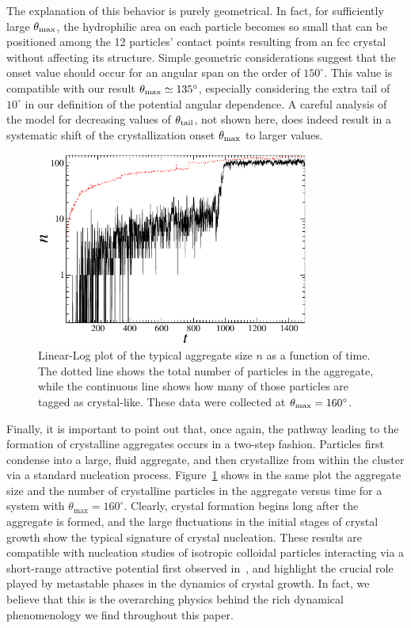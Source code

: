 The explanation of this behavior is purely geometrical.
In fact, for sufficiently large $\theta_{\rm max}$, the hydrophilic area on each particle becomes so small that can be positioned among the 12 particles' contact points resulting from an fcc crystal without affecting its structure.
Simple geometric considerations suggest that the onset value should occur for an angular span on the order of $150^{\circ}$.
This value is compatible with our result $\theta_{\rm max}\simeq 135^{\circ}$, especially considering the extra tail of $10^{\circ}$ in our definition of the potential angular dependence. A careful analysis of the model for decreasing values of $\theta_{\rm tail}$, not shown here, does indeed result in a systematic shift of the crystallization onset $\theta_{\rm max}$ to larger values.

\begin{figure}
	\begin{center}\includegraphics[width=0.8\textwidth]{janus/nucleation}\end{center}
	\caption[Aggregate size vs. time for $\theta_{\rm max}=160^{\circ}$]{\label{fig:nucleation} Linear-Log plot of the typical aggregate size $n$ as a function of time. The dotted line shows the total number of particles in the aggregate, while the continuous line shows how many of those particles are tagged as crystal-like. These data were collected at $\theta_{\rm max}=160^{\circ}$.}
\end{figure}

Finally, it is important to point out that, once again, the pathway leading to the formation of crystalline aggregates occurs in a two-step fashion.
Particles first condense into a large, fluid aggregate, and then crystallize from within the cluster via a standard nucleation process.
Figure~\ref{fig:nucleation} shows in the same plot the aggregate size and the number of crystalline particles in the aggregate versus time for a system with $\theta_{\textrm{max}} = 160^{\circ}$.
Clearly, crystal formation begins long after the aggregate is formed, and the large fluctuations in the initial stages of crystal growth show the typical signature of crystal nucleation. 
These results are compatible with nucleation studies of isotropic colloidal particles interacting via a short-range attractive potential first observed in~\cite{tenwolde}, and highlight the crucial role played by metastable phases in the dynamics of crystal growth.
In fact, we believe that this is the overarching physics behind the rich dynamical phenomenology we find throughout this paper. 

